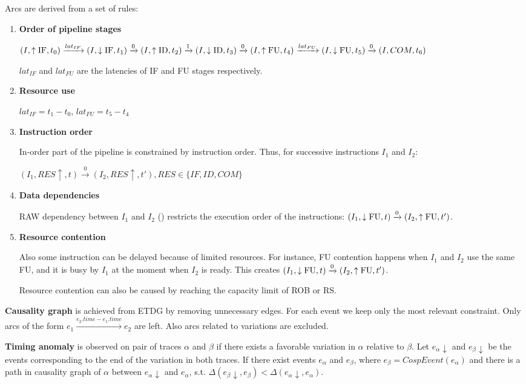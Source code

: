 Arcs are derived from a set of rules:
\begin{enumerate}
    \item \textbf{Order of pipeline stages}
    
    $(I, \uparrow\mathrm{IF}, t_0) \xrightarrow{lat_{IF}} (I, \downarrow\mathrm{IF}, t_1) \xrightarrow{0} (I, \uparrow\mathrm{ID}, t_2) \xrightarrow{1} (I, \downarrow\mathrm{ID}, t_3) \xrightarrow{0} (I, \uparrow\mathrm{FU}, t_4)  \xrightarrow{lat_{FU}} (I, \downarrow\mathrm{FU}, t_5)  \xrightarrow{0} (I, COM, t_6)$

    $lat_{IF}$ and $lat_{FU}$ are the latencies of IF and FU stages respectively.

    \item \textbf{Resource use}
    
    $lat_{IF} = t_1 - t_0$, $lat_{FU} = t_5 - t_4$

    \item \textbf{Instruction order}
    
    In-order part of the pipeline is constrained by instruction order. Thus, for successive instructions $I_1$ and $I_2$:

    $(I_1, RES\uparrow, t) \xrightarrow{0} (I_2, RES\uparrow, t'), RES \in \{IF, ID, COM\}$


    \item \textbf{Data dependencies}
    
    RAW dependency between $I_1$ and $I_2$ () restricts the execution order of the instructions:  $(I_1, \downarrow\mathrm{FU}, t) \xrightarrow{0} (I_2, \uparrow\mathrm{FU}, t')$.
    
    \item \textbf{Resource contention}
    
    Also some instruction can be delayed because of limited resources. For instance, FU contention happens when $I_1$ and $I_2$ use the same FU, and it is busy by $I_1$ at the moment when $I_2$ is ready. This creates $(I_1, \downarrow\mathrm{FU}, t) \xrightarrow{0} (I_2, \uparrow\mathrm{FU}, t')$. 

    Resource contention can also be caused by reaching the capacity limit of ROB or RS. 
\end{enumerate}

\textbf{Causality graph} is achieved from ETDG by removing unnecessary edges. For each event we keep only the most relevant constraint. Only arcs of the form $e_1 \xrightarrow{e_2.time - e_1.time} e_2$ are left. Also arcs related to variations are excluded.

\textbf{Timing anomaly} is observed on pair of traces $\alpha$ and $\beta$ if there exists a favorable variation in $\alpha$ relative to $\beta$. Let $e_\alpha\downarrow$ and $e_\beta\downarrow$ be the events corresponding to the end of the variation in both traces. If there exist events $e_\alpha$ and $e_\beta$, where $e_\beta = CospEvent(e_\alpha)$ and there is a path in causality graph of $\alpha$ between $e_\alpha\downarrow$ and $e_\alpha$, s.t. $\Delta(e_\beta\downarrow,e_\beta) < \Delta(e_\alpha\downarrow,e_\alpha)$.



